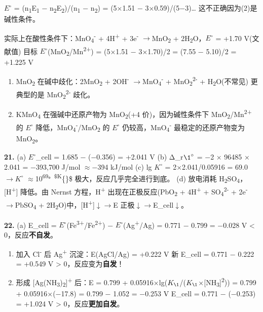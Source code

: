 \documentclass[a4paper,11pt]{ctexart}
\newcommand{\箭}{\ensuremath{\rightarrow}}
\newcommand{\左箭}{\ensuremath{\leftarrow}}
\newcommand{\上箭}{\ensuremath{\uparrow}}
\newcommand{\下箭}{\ensuremath{\downarrow}}
\newcommand{\衡}{\ensuremath{\rightleftharpoons}}
\newcommand{\双箭}{\ensuremath{\leftrightarrow}}
\newcommand{\约等于}{\ensuremath{\approx}}
\newcommand{\小于等于}{\ensuremath{\leq}}
\newcommand{\大于等于}{\ensuremath{\geq}}
\newcommand{\不等于}{\ensuremath{\neq}}
\newcommand{\西格马}{\ensuremath{\sigma}}
\newcommand{\派}{\ensuremath{\pi}}
\begin{document}
\(E^{\circ}\) = (n\textsubscript{1}E\textsubscript{1} − n\textsubscript{2}E\textsubscript{2})/(n\textsubscript{1} − n\textsubscript{2}) = (5×1.51 − 3×0.59)/(5−3)\ldots{} 这不正确因为(2)是碱性条件。

实际上在酸性条件下：MnO\textsubscript{4}\textsuperscript{-} + 4H\textsuperscript{+} + 3e\textsuperscript{-} \箭 MnO\textsubscript{2} + 2H\textsubscript{2}O，\(E^{\circ}\) = +1.70 V(文献值)
目标 \(E^{\circ}\)(MnO\textsubscript{2}/Mn\textsuperscript{2+}) = (5×1.51 − 3×1.70)/2 = (7.55 − 5.10)/2 = +1.225 V

\begin{enumerate}
\def\labelenumi{(\alph{enumi})}
\setcounter{enumi}{1}
\item
  MnO\textsubscript{2} 在碱中歧化：2MnO\textsubscript{2} + 2OH\textsuperscript{-} \箭 MnO\textsubscript{4}\textsuperscript{-} + MnO\textsubscript{2}\textsuperscript{2-} + H\textsubscript{2}O(不常见)
  更典型的是 MnO\textsubscript{2}\textsuperscript{2-} 歧化。
\item
  KMnO\textsubscript{4} 在强碱中还原产物为 MnO\textsubscript{2}(+4 价)，因为碱性条件下 MnO\textsubscript{2}/Mn\textsuperscript{2+} 的 \(E^{\circ}\) 降低，MnO\textsubscript{4}\textsuperscript{-}/MnO\textsubscript{2} 的 \(E^{\circ}\) 仍较高，MnO\textsubscript{4}\textsuperscript{-} 最稳定的还原产物变为 MnO\textsubscript{2}。
\end{enumerate}

\textbf{21.}
(a) \(E^{\circ}\)\_cell = 1.685 − (−0.356) = +2.041 V
(b) Δ\_r\(\1^{\circ}\) = −2 × 96485 × 2.041 = −393,700 J/mol \约等于 −394 kJ/mol
(c) lg \(K^{\circ}\) = 2×2.041/0.05916 = 69.0 \箭 \(K^{\circ}\) \约等于 10\textsuperscript{69。\$K}\{\circ\}\$ 极大，反应几乎完全进行到底。
(d) 放电消耗 H\textsubscript{2}SO\textsubscript{4}，{[}H\textsuperscript{+}{]} 降低。由 Nernst 方程，H\textsuperscript{+} 出现在正极反应(PbO\textsubscript{2} + 4H\textsuperscript{+} + SO\textsubscript{4}\textsuperscript{2-} + 2e\textsuperscript{-} \箭 PbSO\textsubscript{4} + 2H\textsubscript{2}O)中，{[}H\textsuperscript{+}{]}\下箭 \箭 E 正极\下箭 \箭 E\_cell\下箭。

\textbf{22.}
(a) E\_cell = \(E^{\circ}\)(Fe\textsuperscript{3+}/Fe\textsuperscript{2+}) − \(E^{\circ}\)(Ag\textsuperscript{+}/Ag) = 0.771 − 0.799 = −0.028 V \textless{} 0，反应\textbf{不自发}。

\begin{enumerate}
\def\labelenumi{(\alph{enumi})}
\setcounter{enumi}{1}
\item
  加入 Cl\textsuperscript{-} 后 Ag\textsuperscript{+} 沉淀：E(AgCl/Ag) = +0.222 V
  新 E\_cell = 0.771 − 0.222 = +0.549 V \textgreater{} 0，反应变为\textbf{自发}！
\item
  形成 {[}Ag(NH\textsubscript{3})\textsubscript{2}{]}\textsuperscript{+} 后：E = 0.799 + 0.05916×lg(\(K_{\1}\)/(\(K_{\1}\)×{[}NH\textsubscript{3}{]}\textsuperscript{2}))
  = 0.799 + 0.05916×(−17.8) = 0.799 − 1.052 = −0.253 V
  E\_cell = 0.771 − (−0.253) = +1.024 V \textgreater{} 0，反应\textbf{更加自发}。
\end{enumerate}
\end{document}
